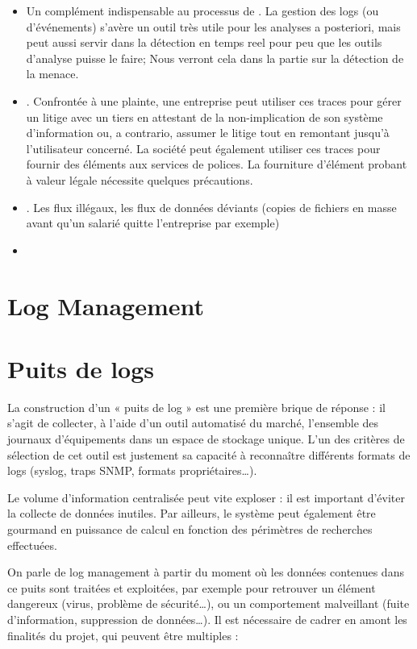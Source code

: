  
 
 \begin{itemize}

   \item Un complément indispensable au processus de . La gestion des logs (ou d’événements) s’avère un outil très utile pour les analyses a posteriori, mais peut aussi servir dans la détection en temps reel pour peu que les outils d'analyse puisse le faire; Nous verront cela dans la partie sur la détection de la menace.


   \item  {}. Confrontée à une plainte, une entreprise peut utiliser ces traces pour gérer un litige avec un tiers  en attestant de la non-implication de son système d’information ou, a contrario, assumer le litige tout en remontant jusqu’à l’utilisateur concerné. La société peut également utiliser ces traces pour fournir des éléments aux services de polices. La fourniture d'élément probant à valeur légale nécessite quelques précautions. 


   \item  {}. Les flux illégaux, les flux de données déviants (copies de fichiers en masse avant qu'un salarié quitte l'entreprise par exemple)
 
   \item 
\end{itemize}

 

\section{Log Management}


\section{Puits de logs}

La construction d’un « puits de log » est une première brique de réponse : il s’agit de collecter, à l’aide d’un outil automatisé du marché, l’ensemble des journaux d’équipements dans un espace de stockage unique. L’un des critères de sélection de cet outil est justement sa capacité à reconnaître différents formats de logs (syslog, traps SNMP, formats propriétaires…).

Le volume d’information centralisée peut vite exploser : il est important d’éviter la collecte de données inutiles. Par ailleurs, le système peut également être gourmand en puissance de calcul en fonction des périmètres de recherches effectuées.

On parle de log management à partir du moment où les données contenues dans ce puits sont traitées et exploitées, par exemple pour retrouver un élément dangereux (virus, problème de sécurité…), ou un comportement malveillant (fuite d’information, suppression de données…). Il est nécessaire de cadrer en amont les finalités du projet,  qui peuvent être multiples :